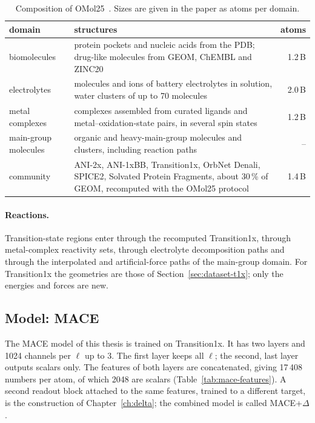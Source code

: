 \begin{table}[h]
\centering
\small
\caption{Composition of OMol25~\cite{omol25}. Sizes are given in the
paper as atoms per domain.}
\label{tab:omol25}
\begin{tabular}{@{}l p{8.6cm} r@{}}
\toprule
domain & structures & atoms \\
\midrule
biomolecules & protein pockets and nucleic acids from the PDB; drug-like
  molecules from GEOM, ChEMBL and ZINC20 & 1.2\,B \\
electrolytes & molecules and ions of battery electrolytes in solution,
  water clusters of up to 70 molecules & 2.0\,B \\
metal complexes & complexes assembled from curated ligands and
  metal--oxidation-state pairs, in several spin states & 1.2\,B \\
main-group molecules & organic and heavy-main-group molecules and
  clusters, including reaction paths & -- \\
community & ANI-2x, ANI-1xBB, Transition1x, OrbNet Denali, SPICE2,
  Solvated Protein Fragments, about 30\,\% of GEOM, recomputed with the
  OMol25 protocol & 1.4\,B \\
\bottomrule
\end{tabular}
\end{table}

\paragraph{Reactions.} Transition-state regions enter through the
recomputed Transition1x, through metal-complex reactivity sets, through
electrolyte decomposition paths and through the interpolated and
artificial-force paths of the main-group domain. For Transition1x the
geometries are those of Section~\ref{sec:dataset-t1x}; only the energies
and forces are new.

\subsection{Model: MACE}
\label{sec:model-mace}

The MACE model of this thesis is trained on Transition1x. It has two
layers and 1024 channels per $\ell$ up to 3. The first layer keeps all
$\ell$; the second, last layer outputs scalars only. The features of both
layers are concatenated, giving 17\,408 numbers per atom, of which 2048
are scalars (Table~\ref{tab:mace-features}). A second readout block
attached to the same features, trained to a different target, is the
construction of Chapter~\ref{ch:delta}; the combined model is called
MACE+$\Delta$.

